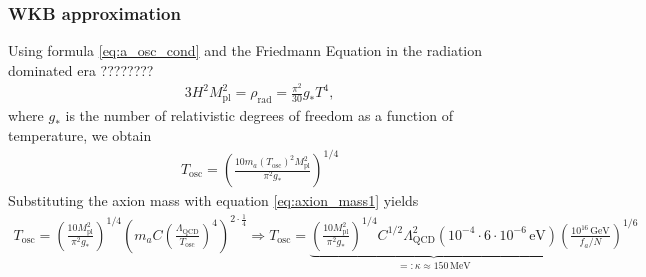 \documentclass[a4paper]{article}
\begin{document}
\subsubsection{WKB approximation}
Using formula \ref{eq:a_osc_cond} and the Friedmann Equation in the radiation dominated era ????????
\begin{align}
    \label{eq:friedmann_rad_thermo}
    3 H^2 M_\mathrm{pl}^2 = \rho_\mathrm{rad} = \frac{\pi^2}{30} g_* T^4,
\end{align}
where $g_*$ is the number of relativistic degrees of freedom as a function of temperature,
we obtain 
\begin{align*}
    T_\mathrm{osc} = \left( \frac{10 m_a(T_\mathrm{osc})^2 M_\mathrm{pl}^2}{\pi^2 g_*} \right)^{1/4}
\end{align*}
Substituting the axion mass with equation \ref{eq:axion_mass1} yields
\begin{align}
    \label{eq:T_osc1}
    T_\mathrm{osc} = \left( \frac{10 M_\mathrm{pl}^2}{\pi^2 g_*} \right)^{1/4} \left( m_a C \left( \frac{\Lambda_\mathrm{QCD}}{T_\mathrm{osc}} \right)^{4} \right)^{2 \cdot \frac{1}{4}}
    \Rightarrow T_\mathrm{osc} = \underbrace{\left( \frac{10 M_\mathrm{pl}^2}{\pi^2 g_*} \right)^{1/4} C^{1/2} \Lambda_\mathrm{QCD}^2 (10^{-4} \cdot 6 \cdot 10^{-6} \, \mathrm{eV}) }_{=: \kappa \approx 150 \, \mathrm{MeV} } \left( \frac{10^{16} \, \mathrm{GeV}}{f_a / N} \right)^{1/6}
\end{align}
\end{document}
